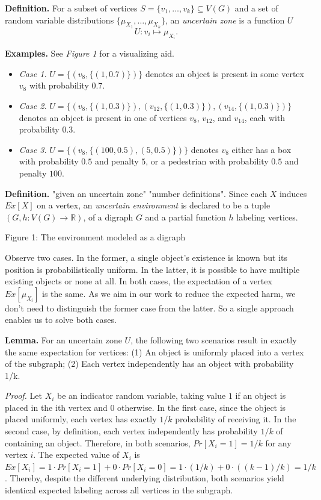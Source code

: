\documentclass[pdflatex,sn-mathphys-num]{sn-jnl}%
\begin{document}
\textbf{Definition.} For a subset of vertices $S = \{ v_1, \dots, v_k \} \subseteq V(G)$ and a set of random variable distributions $\{ \mu_{X_1}, \dots, \mu_{X_k} \}$, an \textit{uncertain zone} is a function $U$
$$
U: v_i \mapsto \mu_{X_i}.
$$

\textbf{Examples.} See \textit{Figure 1} for a visualizing aid.
\begin{itemize}
    \item \textit{Case 1.} $U = \{ (v_8, \{(1, 0.7)\} ) \}$ denotes an object is present in some vertex $v_8$ with probability $0.7$.
    \item \textit{Case 2.} $U = \{ (v_8, \{(1, 0.3)\}), (v_{12}, \{(1, 0.3)\}), (v_{14}, \{(1, 0.3)\}) \}$ denotes an object is present in one of vertices $v_8$, $v_{12}$, and $v_{14}$, each with probability $0.3$.
    \item \textit{Case 3.} $U = \{ (v_8, \{ (100, 0.5), (5, 0.5) \} ) \}$ denotes $v_8$ either has a box with probability $0.5$ and penalty $5$, or a pedestrian with probability $0.5$ and penalty $100$.
\end{itemize}

\textbf{Definition.} "given an uncertain zone" "number definitions". Since each $X$ induces $Ex[X]$ on a vertex, an \textit{uncertain environment} is declared to be a tuple $(G, h:V(G) \rightarrow \mathbb{R} )$, of a digraph $G$ and a partial function $h$ labeling vertices.

\begin{center}
  
  Figure 1: The environment modeled as a digraph
\end{center}

\vspace{5mm}

Observe two cases. In the former, a single object's existence is known but its position is probabilistically uniform. In the latter, it is possible to have multiple existing objects or none at all. In both cases, the expectation of a vertex $Ex[\mu_{X_i}]$ is the same. As we aim in our work to reduce the expected harm, we don't need to distinguish the former case from the latter. So a single approach enables us to solve both cases.

\textbf{Lemma.} For an uncertain zone $U$, the following two scenarios result in exactly the same expectation for vertices: (1) An object is uniformly placed into a vertex of the subgraph; (2) Each vertex independently has an object with probability 1/k.

\textit{Proof.} Let $X_i$ be an indicator random variable, taking value $1$ if an object is placed in the ith vertex and $0$ otherwise. In the first case, since the object is placed uniformly, each vertex has exactly $1/k$ probability of receiving it. In the second case, by definition, each vertex independently has probability $1/k$ of containing an object. Therefore, in both scenarios, $Pr[X_i=1] = 1/k$ for any vertex $i$. The expected value of $X_i$ is $Ex[X_i] = 1 \cdot Pr[X_i=1] + 0 \cdot Pr[X_i=0] = 1 \cdot (1/k) + 0 \cdot ((k-1)/k) = 1/k$. Thereby, despite the different underlying distribution, both scenarios yield identical expected labeling across all vertices in the subgraph.
\end{document}
